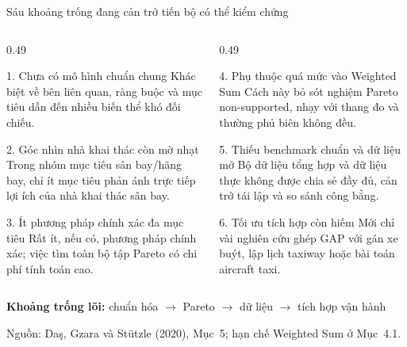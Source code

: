 \documentclass[aspectratio=169,10pt]{beamer}
\begin{document}
\begin{frame}[t]{Sáu khoảng trống đang cản trở tiến bộ có thể kiểm chứng}

\footnotesize
\begin{columns}[T,onlytextwidth]
\begin{column}{0.49\textwidth}
\begin{block}{1. Chưa có mô hình chuẩn chung}
Khác biệt về bên liên quan, ràng buộc và mục tiêu dẫn đến nhiều biến thể khó đối chiếu.
\end{block}

\begin{block}{2. Góc nhìn nhà khai thác còn mờ nhạt}
Trong nhóm mục tiêu sân bay/hãng bay, chỉ ít mục tiêu phản ánh trực tiếp lợi ích của nhà khai thác sân bay.
\end{block}

\begin{alertblock}{3. Ít phương pháp chính xác đa mục tiêu}
Rất ít, nếu có, phương pháp chính xác; việc tìm toàn bộ tập Pareto có chi phí tính toán cao.
\end{alertblock}
\end{column}

\begin{column}{0.49\textwidth}
\begin{alertblock}{4. Phụ thuộc quá mức vào Weighted Sum}
Cách này bỏ sót nghiệm Pareto non-supported, nhạy với thang đo và thường phủ biên không đều.
\end{alertblock}

\begin{block}{5. Thiếu benchmark chuẩn và dữ liệu mở}
Bộ dữ liệu tổng hợp và dữ liệu thực không được chia sẻ đầy đủ, cản trở tái lập và so sánh công bằng.
\end{block}

\begin{exampleblock}{6. Tối ưu tích hợp còn hiếm}
Mới chỉ vài nghiên cứu ghép GAP với gán xe buýt, lập lịch taxiway hoặc bài toán aircraft taxi.
\end{exampleblock}
\end{column}
\end{columns}

\vspace{0.2ex}
\centering
\small
\textbf{Khoảng trống lõi:} \alert{chuẩn hóa} $\rightarrow$ \alert{Pareto}
$\rightarrow$ \alert{dữ liệu} $\rightarrow$ \alert{tích hợp vận hành}

\vfill
\tiny Nguồn: Da\c{s}, Gzara và St\"utzle (2020), Mục~5; hạn chế Weighted Sum ở Mục~4.1.
\end{frame}
\end{document}
